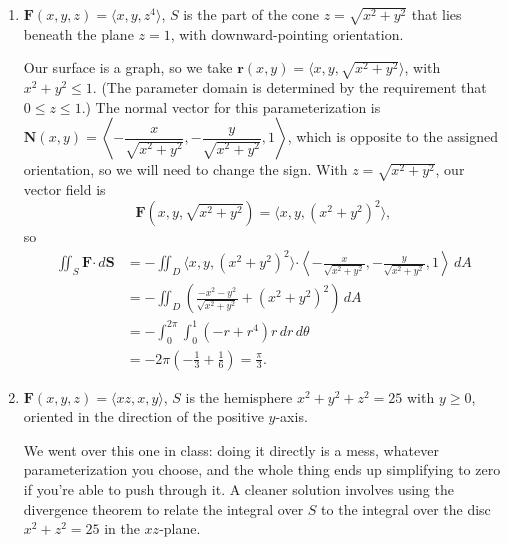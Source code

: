 \documentclass[12pt,letterpaper]{article}
\newcommand{\dotp}{\boldsymbol{\cdot}}
\renewcommand{\S}{\mathbf{S}}
\renewcommand{\r}{\mathbf{r}}
\newcommand{\F}{\mathbf{F}}
\newcommand{\N}{\mathbf{N}}
\begin{document}
\begin{enumerate}
 \item $\F(x,y,z) = \langle x, y, z^4\rangle$, $S$ is the part of the cone $z=\sqrt{x^2+y^2}$ that lies beneath the plane $z=1$, with downward-pointing orientation.

\bigskip

Our surface is a graph, so we take $\r(x,y) = \langle x, y, \sqrt{x^2+y^2}\rangle$, with $x^2+y^2\leq 1$. (The parameter domain is determined by the requirement that $0\leq z\leq 1$.) The normal vector for this parameterization is $\N(x,y) = \left\langle -\dfrac{x}{\sqrt{x^2+y^2}}, -\dfrac{y}{\sqrt{x^2+y^2}}, 1\right\rangle$, which is opposite to the assigned orientation, so we will need to change the sign. With $z=\sqrt{x^2+y^2}$, our vector field is
\[
 \F(x,y,\sqrt{x^2+y^2}) = \langle x, y, (x^2+y^2)^2\rangle,
\]
so
\begin{align*}
 \iint_S\F\dotp\,d\S & = -\iint_D \langle x, y, (x^2+y^2)^2\rangle\dotp \left\langle -\frac{x}{\sqrt{x^2+y^2}}, -\frac{y}{\sqrt{x^2+y^2}}, 1\right\rangle\,dA\\
& = -\iint_D \left(\frac{-x^2-y^2}{\sqrt{x^2+y^2}}+(x^2+y^2)^2\right)\,dA\\
& = -\int_0^{2\pi}\int_0^1 (-r+r^4)r\,dr\,d\theta\\
& = -2\pi\left(-\frac{1}{3}+\frac{1}{6}\right) = \frac{\pi}{3}.
\end{align*}



 \item $\F(x,y,z) = \langle xz, x, y\rangle$, $S$ is the hemisphere $x^2+y^2+z^2=25$ with $y\geq 0$, oriented in the direction of the positive $y$-axis.

\bigskip

We went over this one in class: doing it directly is a mess, whatever parameterization you choose, and the whole thing ends up simplifying to zero if you're able to push through it. A cleaner solution involves using the divergence theorem to relate the integral over $S$ to the integral over the disc $x^2+z^2=25$ in the $xz$-plane.
\end{enumerate}
\end{document}

